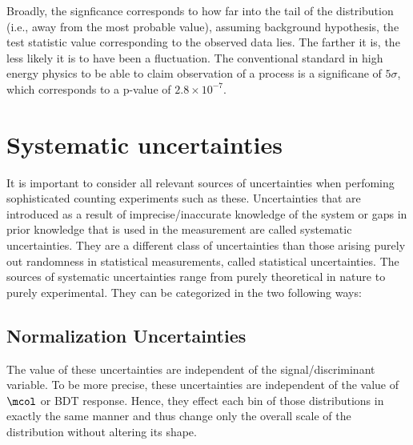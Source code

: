 Broadly, the signficance corresponds to how far into the tail of the distribution (i.e., away from the most probable value), assuming background hypothesis, the test statistic value corresponding to the observed data lies. The farther it is, the less likely it is to have been a fluctuation. The conventional standard in high energy physics to be able to claim observation of a process is a significane of $5\sigma$, which corresponds to a p-value of $2.8\times 10^{-7}$.


\section{Systematic uncertainties}
\label{exp_uncert}
It is important to consider all relevant sources of uncertainties when perfoming sophisticated counting experiments such as these. Uncertainties that are introduced as a result of imprecise/inaccurate knowledge of the system or gaps in prior knowledge that is used in the measurement are called systematic uncertainties. They are a different class of uncertainties than those arising purely out randomness in statistical measurements, called statistical uncertainties. The sources of systematic uncertainties range from purely theoretical in nature to purely experimental. They can be categorized in the two following ways:
\subsection{Normalization Uncertainties}
The value of these uncertainties are independent of the signal/discriminant variable. To be more precise, these uncertainties are independent of the value of $\mcol$ or BDT response. Hence, they effect each bin of those distributions in exactly the same manner and thus change only the overall scale of the distribution without altering its shape.

